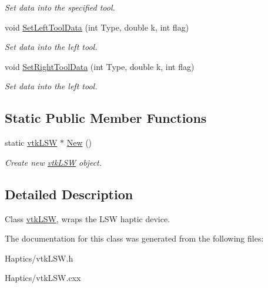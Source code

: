 \begin{DoxyCompactItemize}
\begin{DoxyCompactList}\small\item\em Set data into the specified tool. \item\end{DoxyCompactList}\item 
\hypertarget{classvtkLSW_ae761b6cf47566ba99acfff3c1b3df39f}{
void \hyperlink{classvtkLSW_ae761b6cf47566ba99acfff3c1b3df39f}{SetLeftToolData} (int Type, double k, int flag)}
\label{classvtkLSW_ae761b6cf47566ba99acfff3c1b3df39f}

\begin{DoxyCompactList}\small\item\em Set data into the left tool. \item\end{DoxyCompactList}\item 
\hypertarget{classvtkLSW_aeee6fdae11961237c8542ce5e6e6e610}{
void \hyperlink{classvtkLSW_aeee6fdae11961237c8542ce5e6e6e610}{SetRightToolData} (int Type, double k, int flag)}
\label{classvtkLSW_aeee6fdae11961237c8542ce5e6e6e610}

\begin{DoxyCompactList}\small\item\em Set data into the left tool. \item\end{DoxyCompactList}\end{DoxyCompactItemize}
\subsection*{Static Public Member Functions}
\begin{DoxyCompactItemize}
\item 
\hypertarget{classvtkLSW_a387712b4a9a6247add516701cf0be560}{
static \hyperlink{classvtkLSW}{vtkLSW} $\ast$ \hyperlink{classvtkLSW_a387712b4a9a6247add516701cf0be560}{New} ()}
\label{classvtkLSW_a387712b4a9a6247add516701cf0be560}

\begin{DoxyCompactList}\small\item\em Create new \hyperlink{classvtkLSW}{vtkLSW} object. \item\end{DoxyCompactList}\end{DoxyCompactItemize}


\subsection{Detailed Description}
Class \hyperlink{classvtkLSW}{vtkLSW}, wraps the LSW haptic device. 

The documentation for this class was generated from the following files:\begin{DoxyCompactItemize}
\item 
Haptics/vtkLSW.h\item 
Haptics/vtkLSW.cxx\end{DoxyCompactItemize}
